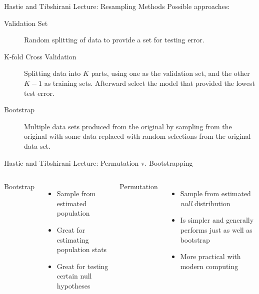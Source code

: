 \documentclass{beamer}
\begin{document}
\begin{frame}{Hastie and Tibshirani Lecture: Resampling Methods}
	Possible approaches: \vspace{1em}
	\begin{description}
		\item[Validation Set] Random splitting of data to provide a set for testing error.
		\item[K-fold Cross Validation] Splitting data into $K$ parts, using one as the validation set, and the other $K-1$ as training sets. Afterward select the model that provided the lowest test error.
		\item[Bootstrap] Multiple data sets produced from the original by sampling from the original with some data replaced with random selections from the original data-set.
	\end{description}
\end{frame}

\begin{frame}{Hastie and Tibshirani Lecture: Permutation v. Bootstrapping}
	\begin{columns}	
	Bootstrap
	\begin{itemize}
		\item<1-> Sample from estimated population
		\item<2-> Great for estimating population stats
		\item<3-> Great for testing certain null hypotheses
	\end{itemize}

	Permutation
		\begin{itemize}
			\item<1-> Sample from estimated \emph{null} distribution
			\item<2-> Is simpler and generally performs just as well as bootstrap
			\item<3-> More practical with modern computing
		\end{itemize}
	\end{columns}
\end{frame}
\end{document}
